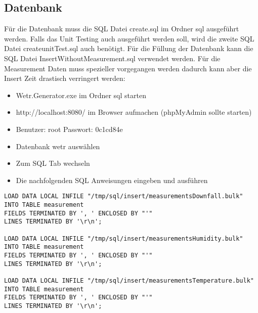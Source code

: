 \subsection{Datenbank}
Für die Datenbank muss die SQL Datei \grqq{}create.sql \grqq{} im Ordner sql ausgeführt werden. Falls das Unit Testing auch ausgeführt werden soll, wird die zweite SQL Datei \grqq{}create\textunderscore unitTest.sql \grqq{} auch benötigt.
\newline\newline
Für die Füllung der Datenbank kann die SQL Datei \grqq{}InsertWithoutMeasurement.sql\grqq{} verwendet werden. Für die Measurement Daten muss spezieller vorgegangen werden dadurch kann aber die Insert Zeit drastisch verringert werden:
\begin{itemize}
\item Wetr.Generator.exe im Ordner sql starten
\item http://localhost:8080/ im Browser aufmachen \newline (phpMyAdmin sollte starten)
\item Benutzer: root Passwort: 0c1cd84e
\item Datenbank wetr auswählen
\item Zum SQL Tab wechseln
\item Die nachfolgenden SQL Anweisungen eingeben und ausführen
\end{itemize}
\newpage
\begin{verbatim}
LOAD DATA LOCAL INFILE "/tmp/sql/insert/measurementsDownfall.bulk" INTO TABLE measurement
FIELDS TERMINATED BY ', ' ENCLOSED BY "'"
LINES TERMINATED BY '\r\n';

LOAD DATA LOCAL INFILE "/tmp/sql/insert/measurementsHumidity.bulk" INTO TABLE measurement
FIELDS TERMINATED BY ', ' ENCLOSED BY "'"
LINES TERMINATED BY '\r\n';

LOAD DATA LOCAL INFILE "/tmp/sql/insert/measurementsTemperature.bulk" INTO TABLE measurement
FIELDS TERMINATED BY ', ' ENCLOSED BY "'"
LINES TERMINATED BY '\r\n';
\end{verbatim}